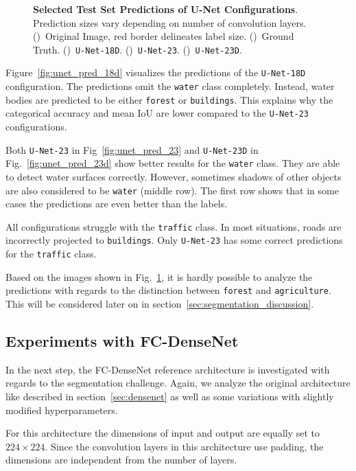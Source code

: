\begin{figure}[h]
    \caption[Selected Test Set Predictions of U-Net Configurations]
    {\textbf{Selected Test Set Predictions of U-Net Configurations}. Prediction sizes vary depending on number of convolution layers.
    ()~Original Image, red border delineates label size.
    ()~Ground Truth.
    ()~\texttt{U-Net-18D}.
    ()~\texttt{U-Net-23}.
    ()~\texttt{U-Net-23D}.}
    \label{fig:unet_prediction_images}
\end{figure}

Figure~\ref{fig:unet_pred_18d} visualizes the predictions of the \texttt{U-Net-18D} configuration. The predictions omit the \texttt{water} class completely. Instead, water bodies are predicted to be either \texttt{forest} or \texttt{buildings}. This explains why the categorical accuracy and mean IoU are lower compared to the \texttt{U-Net-23} configurations.

Both \texttt{U-Net-23} in Fig~\ref{fig:unet_pred_23} and \texttt{U-Net-23D} in Fig.~\ref{fig:unet_pred_23d} show better results for the \texttt{water} class. They are able to detect water surfaces correctly. However, sometimes shadows of other objects are also considered to be \texttt{water} (middle row). The first row shows that in some cases the predictions are even better than the labels.

All configurations struggle with the \texttt{traffic} class. In most situations, roads are incorrectly projected to \texttt{buildings}. Only \texttt{U-Net-23} has some correct predictions for the \texttt{traffic} class.

Based on the images shown in Fig.~\ref{fig:unet_prediction_images}, it is hardly possible to analyze the predictions with regards to the distinction between \texttt{forest} and \texttt{agriculture}. This will be considered later on in section~\ref{sec:segmentation_discussion}.

\subsection{Experiments with FC-DenseNet}
\label{sec:densenet_experiments}
In the next step, the FC-DenseNet reference architecture is investigated with regards to the segmentation challenge. Again, we analyze the original architecture like described in section~\ref{sec:densenet} as well as some variations with slightly modified hyperparameters.

For this architecture the dimensions of input and output are equally set to $224\times 224$. Since the convolution layers in this architecture use padding, the dimensions are independent from the number of layers.

